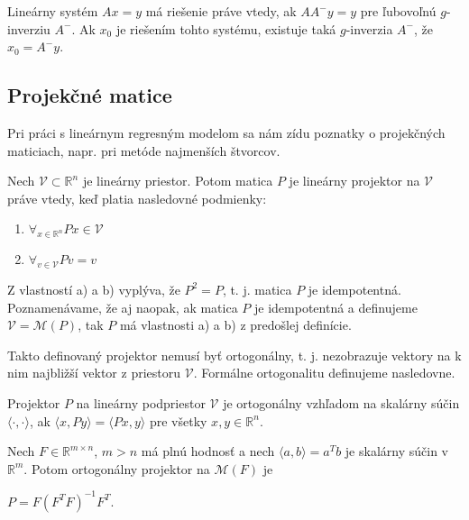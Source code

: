 \begin{theorem}
\label{veta4}
Lineárny systém $Ax = y$ má riešenie práve vtedy, ak $A A^- y = y$ pre ľubovoľnú $g$-inverziu $A^-$.
Ak $x_0$ je riešením tohto systému, existuje taká $g$-inverzia $A^-$, že $x_0 = A^- y$.
\end{theorem}

\subsection{Projekčné matice}

Pri práci s lineárnym regresným modelom sa nám zídu poznatky o projekčných maticiach, napr. pri metóde najmenších štvorcov.

\begin{defin}
\label{linearny projektor}
Nech $\mathcal{V} \subset \mathbb{R}^n$ je lineárny priestor. Potom matica $P$ je lineárny projektor na $\mathcal{V}$ práve vtedy,
keď platia nasledovné podmienky:
\begin{enumerate}[label=\emph{\alph*})]
  \item
    $
    {\forall}_{x \in \mathbb{R}^n} Px \in \mathcal{V}
    $
  \item
    $
    {\forall}_{v \in \mathcal{V}} Pv = v
    $
\end{enumerate}
\end{defin}

Z vlastností a) a b) vyplýva, že $P^2 = P$, t. j. matica $P$ je idempotentná.
Poznamenávame, že aj naopak, ak matica $P$ je idempotentná a definujeme $\mathcal{V} = \mathcal{M}(P)$, tak $P$ má vlastnosti a) a b) z predošlej definície.

Takto definovaný projektor nemusí byť ortogonálny, t. j. nezobrazuje vektory na k nim najbližší vektor z priestoru $\mathcal{V}$.
Formálne ortogonalitu definujeme nasledovne.

\begin{defin}
\label{ortogonalny projektor}
Projektor $P$ na lineárny podpriestor $\mathcal{V}$ je ortogonálny vzhľadom na skalárny súčin $\langle \cdot,\cdot \rangle$,
ak $\langle x, Py \rangle = \langle Px, y \rangle$ pre všetky $x, y \in \mathbb{R}^n$.
\end{defin}

\begin{theorem}
Nech $F \in \mathbb{R}^{m \times n}$, $m > n$ má plnú hodnosť a nech $\langle a, b \rangle = a^T b$ je skalárny súčin v $\mathbb{R}^m$.
Potom ortogonálny projektor na $\mathcal{M}(F)$ je
\begin{center}
$
P = F(F^T F)^{-1} F^T
$.
\end{center}
\end{theorem}

